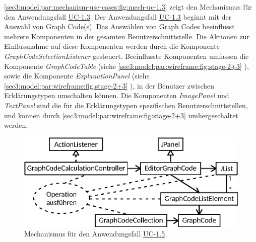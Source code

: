 \cref{sec3:model:par:mechanism-use-cases:fig:mech-uc-1.3} zeigt den Mechanismus für den Anwendungsfall \hyperref[sec3:model:uc-1.3]{UC-1.3}.
Der Anwendungsfall \hyperref[sec3:model:uc-1.3]{UC-1.3} beginnt mit der Auswahl von Graph Code(s).
Das Auswählen von Graph Codes beeinflusst mehrere Komponenten in der gesamten Benutzerschnittstelle.
Die Aktionen zur Einflussnahme auf diese Komponenten werden durch die Komponente \textit{GraphCodeSelectionListener} gesteuert.
Beeinflusste Komponenten umfassen die Komponente \textit{GraphCodeTable} (siehe \cref{sec3:model:par:wireframe:fig:stage-2+3} ), sowie die Komponente \textit{ExplanationPanel} (siehe \cref{sec3:model:par:wireframe:fig:stage-2+3} ), in der Benutzer zwischen Erklärungstypen umschalten können.
Die Komponenten \textit{ImagePanel} und \textit{TextPanel} sind die für die Erklärungstypen spezifischen Benutzerschnittstellen, und können durch \cref{sec3:model:par:wireframe:fig:stage-2+3}  umhergeschaltet werden.

\begin{figure}[htb]
    \centering
    \includegraphics{chapter/chapter_3/mechanisms/mechanism-uc-1.5.eps}
    \caption{Mechanismus für den Anwendungsfall \hyperref[sec3:model:uc-1.5]{UC-1.5}.}
    \label{sec3:model:par:mechanism-use-cases:fig:mech-uc-1.5}
\end{figure}

